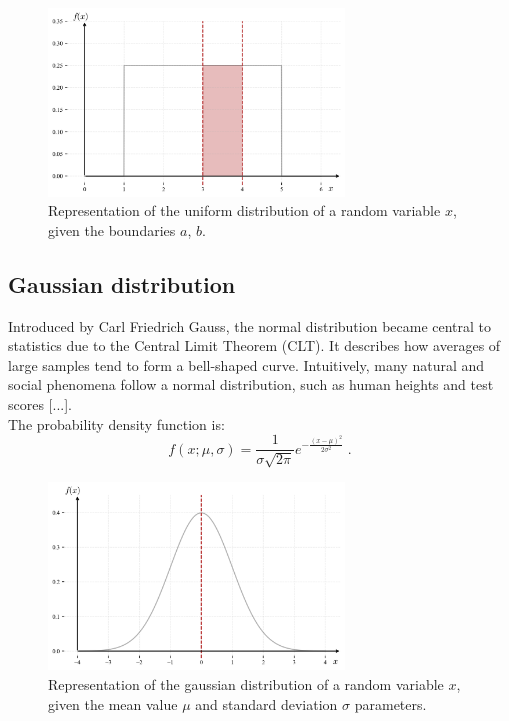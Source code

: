 \documentclass{book}
\begin{document}
\begin{figure}[ht]
    \centering
    \includegraphics[width=0.7\textwidth]{figures/chapter2/uniform_2.png}
    \caption{Representation of the uniform distribution of a random variable $x$, given the boundaries $a$, $b$.}
    \label{fig:uniform1}
\end{figure}

\newpage

\subsection{Gaussian distribution}
Introduced by Carl Friedrich Gauss, the normal distribution became central to statistics due to the Central Limit Theorem (CLT). It describes how averages of large samples tend to form a bell-shaped curve. Intuitively, many natural and social phenomena follow a normal distribution, such as human heights and test scores [...].\\

The probability density function is:
\begin{equation}
    f(x; \mu, \sigma) = \frac{1}{\sigma \sqrt{2\pi}} e^{-\frac{(x-\mu)^2}{2\sigma^2}} \; .
\end{equation}

\begin{figure}[ht]
    \centering
    \includegraphics[width=0.7\textwidth]{figures/chapter2/gaussian_1.png}
    \caption{Representation of the gaussian distribution of a random variable $x$, given the mean value $\mu$ and standard deviation $\sigma$ parameters.}
    \label{fig:gaussian1}
\end{figure}
\end{document}
